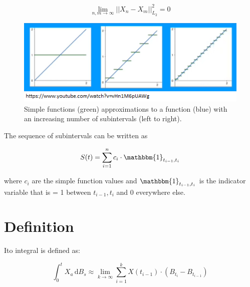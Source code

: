 \documentclass[12pt]{article}
\begin{document}
\begin{equation}
	\lim\limits_{n,m\to\infty}||X_n-X_m||^2_{L_2}=0
\end{equation}

\begin{figure}[h!]
	\centering
	\includegraphics[width=\linewidth]{quantPieScreenShot.png}
	\caption{Simple functions (green) approximations to a function (blue) with an increasing number of subintervals (left to right).}
	\label{fig:quantPieScreenShot}
\end{figure}

\noindent The sequence of subintervals can be written as

\begin{eqnarray}
	S(t)=\sum_{i=1}^{n}c_i\cdot\mathbbm{1}_{t_{i-1}, t_i}
\end{eqnarray}

\noindent where $c_i$ are the simple function values and $\mathbbm{1}_{t_{i-1}, t_i}$ is the indicator variable that is = 1 between ${t_{i-1}, t_i}$ and 0 everywhere else.








\section{Definition}

Ito integral is defined as:

\begin{equation} \label{eq:itoIntegral}
	\int_{0}^{t}X_a\,\mathrm{d}B_s\approx\lim\limits_{k\to\infty}\sum_{i=1}^{k}X(t_{i-1})\cdot(B_{t_i}-B_{t_{i-1}})
\end{equation}
\end{document}
